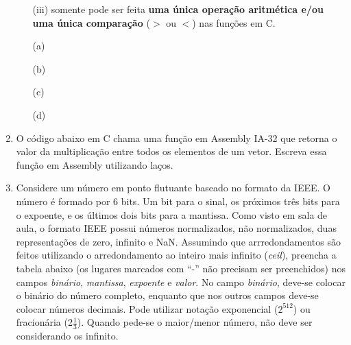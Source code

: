 \begin{enumerate}[resume]
\begin{enumerate}
        \item [(iii)]
        somente pode ser feita \textbf{uma única operação aritmética 
        e/ou uma única comparação} ($>$ ou $<$) nas funções em C.
    \end{enumerate}

    \begin{itemize}
        \item [(a)] 
        \item [(b)] 
        \item [(c)] 
        \item [(d)] 
    \end{itemize}

    \item   
    O código abaixo em C chama uma função em Assembly IA-32 que
    retorna o valor da multiplicação entre todos os elementos de um vetor.
    Escreva essa função em Assembly utilizando laços.


    \item
    Considere um número em ponto flutuante baseado no formato da IEEE.
    O número é formado por 6 bits. 
    Um bit para o sinal, 
    os próximos três bits para o expoente,
    e os últimos dois bits para a mantissa.
    Como visto em sala de aula, o formato IEEE possui números normalizados,
    não normalizados, duas representações de zero, infinito e NaN.
    Assumindo que arrredondamentos são feitos utilizando
    o arredondamento ao inteiro mais infinito (\textit{ceil}),
    preencha a tabela abaixo (os lugares marcados com ``-'' não precisam ser preenchidos)
    nos campos \textit{binário}, \textit{mantissa}, \textit{expoente} e \textit{valor}.
    No campo \textit{binário}, deve-se colocar o binário do número completo,
    enquanto que nos outros campos deve-se colocar números decimais.
    Pode utilizar notação exponencial ($2^{512}$) ou fracionária (2$\frac{1}{3}$).
    Quando pede-se o maior/menor número, não deve ser considerando os  infinito.


\end{enumerate}
